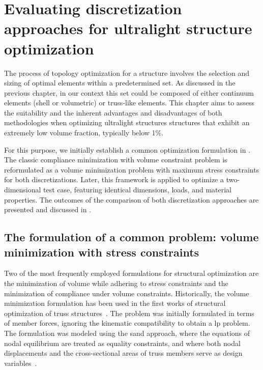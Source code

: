 \setchapterpreamble[u]{\margintoc}
\chapter{Evaluating discretization approaches for ultralight structure optimization}
The process of topology optimization for a structure involves the selection and sizing of optimal elements within a predetermined set. As discussed in the previous chapter, in our context this set could be composed of either continuum elements (shell or volumetric) or truss-like elements. This chapter aims to assess the suitability and the inherent advantages and disadvantages of both methodologies when optimizing ultralight structures \ie structures that exhibit  an extremely low volume fraction, typically below 1\%. 

For this purpose, we initially establish a common optimization formulation in . The classic compliance minimization with volume constraint problem is reformulated as a volume minimization problem with maximum stress constraints for both discretizations. Later, this framework is applied to optimize a two-dimensional test case, featuring identical dimensions, loads, and material properties. The outcomes of the comparison of both discretization approaches are presented and discussed in . 

\section{The formulation of a common problem: volume minimization with stress constraints} \label{sec:03_common_prob}
Two of the most frequently employed formulations for structural optimization are the minimization of volume while adhering to stress constraints and the minimization of compliance under volume constraints. Historically, the volume minimization formulation has been used in the first works of structural optimization of truss structures~. The problem was initially formulated in terms of member forces, ignoring the kinematic compatibility to obtain a \gls{lp} problem. The formulation was modeled using the \acrfull{sand} approach, where the equations of nodal equilibrium are treated as equality constraints, and where both nodal displacements and the cross-sectional areas of truss members serve as design variables~. 

